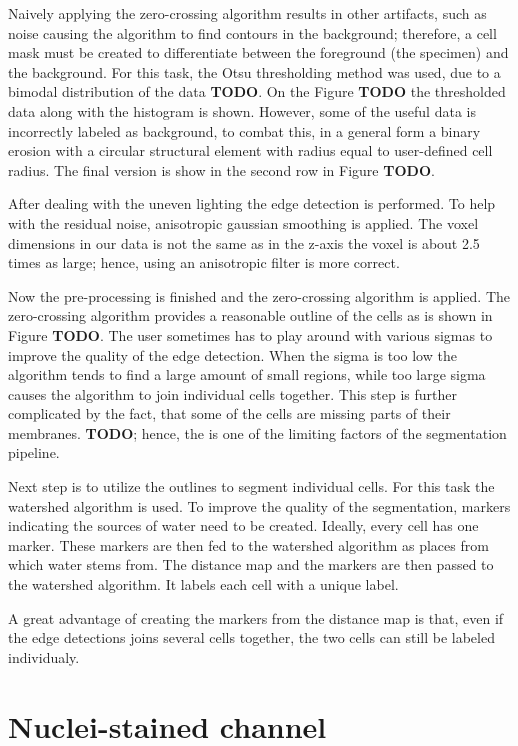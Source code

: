 \documentclass[
  digital,     %
  oneside,     %
  nosansbold,  %
  nocolorbold, %
  lof,         %
  lot,         %
]{fithesis4}
\begin{document}
Naively applying the zero-crossing algorithm results in other artifacts, such
as noise causing the algorithm to find contours in the background; therefore,
a cell mask must be created to differentiate between the foreground (the
specimen) and the background. For this task, the Otsu thresholding method was
used, due to a bimodal distribution of the data \textbf{TODO}. On the Figure
\textbf{TODO} the thresholded data along with the histogram is shown. However,
some of the useful data is incorrectly labeled as background, to combat this, in
a general form a binary erosion with a circular structural element with radius
equal to user-defined cell radius. The final version is show in the second row
in Figure \textbf{TODO}.

After dealing with the uneven lighting the edge detection is performed. To help
with the residual noise, anisotropic gaussian smoothing is applied. The voxel
dimensions in our data is not the same as in the z-axis the voxel is about 2.5
times as large; hence, using an anisotropic filter is more correct. 

Now the pre-processing is finished and the zero-crossing algorithm is applied.
The zero-crossing algorithm provides a reasonable outline of the cells as is
shown in Figure \textbf{TODO}. The user sometimes has to play around with
various sigmas to improve the quality of the edge detection. When the sigma is
too low the algorithm tends to find a large amount of small regions, while too
large sigma causes the algorithm to join individual cells together. This step
is further complicated by the fact, that some of the cells are missing parts of
their membranes. \textbf{TODO}; hence, the is one of the limiting factors of
the segmentation pipeline.

Next step is to utilize the outlines to segment individual cells. For this task
the watershed algorithm is used. To improve the quality of the segmentation,
markers indicating the sources of water need to be created. Ideally, every cell
has one marker. These markers are then fed to the watershed algorithm as places
from which water stems from. %
The distance map and the markers are then passed to the
watershed algorithm. It labels each cell with a unique label.

A great advantage of creating the markers from the distance map is that, even if
the edge detections joins several cells together, the two cells can still be
labeled individualy.

\section{Nuclei-stained channel}
\end{document}
